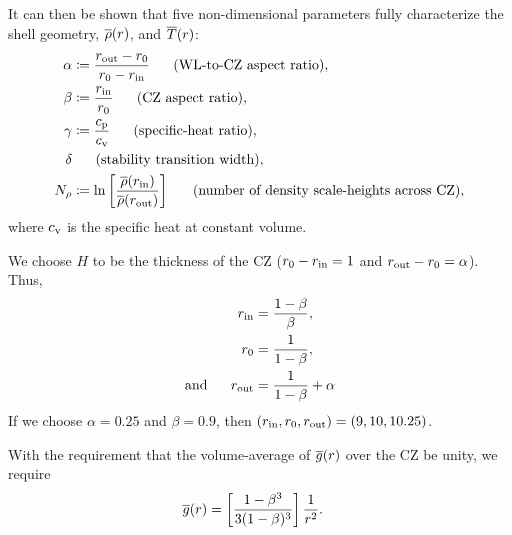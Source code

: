 \documentclass[12pt]{article}
\numberwithin{equation}{section}
\begin{document}
It can then be shown that five non-dimensional parameters fully characterize the shell geometry, $\overline{\rho}(r)$, and $\overline{T}(r)$:
\begin{subequations}
	\begin{align}
		\alpha&\coloneqq \frac{r_{\rm{out}}-r_0}{r_0-r_{\rm{in}}} \ \ \ \ \ \text{(WL-to-CZ\ aspect ratio)},\\ 
		\beta &\coloneqq \frac{r_{\rm{in}}}{r_0} \ \ \ \ \ \text{(CZ aspect ratio)},\\
		\gamma&\coloneqq \frac{c_{\rm{p}}}{c_{\rm{v}}}\ \ \ \ \ \text{(specific-heat ratio)},\\
		\delta &\ \ \ \ \ \text{(stability transition width)},\\	
		N_\rho &\coloneqq \ln\left[\frac{\overline{\rho}(r_{\rm{in}})}{\overline{\rho}(r_{\rm{out}})}\right]\ \ \ \ \ \text{(number of density scale-heights across CZ)},
	\end{align}
\end{subequations}
where $c_{\rm{v}}$ is the specific heat at constant volume. 

We choose $H$ to be the thickness of the CZ ($r_0-r_{\rm{in}}=1$ and $r_{\rm{out}}-r_0=\alpha$). Thus,
\begin{subequations}
	\begin{align}
		r_{\rm{in}} &=\frac{1-\beta}{\beta},\\
		r_0 &= \frac{1}{1-\beta},\\
		\text{and}\ \ \ \ \  r_{\rm{out}} &=  \frac{1}{1-\beta} + \alpha
	\end{align}
\end{subequations}
If we choose $\alpha=0.25$ and $\beta=0.9$, then $(r_{\rm{in}},r_0,r_{\rm{out}})=(9, 10, 10.25)$. 

With the requirement that the volume-average of $\overline{g}(r)$ over the CZ be unity, we require
\begin{align}
	\overline{g}(r) &= \left[ \frac{1-\beta^3}{3(1-\beta)^3}    \right]\frac{1}{r^2}.
\end{align}
\end{document}
